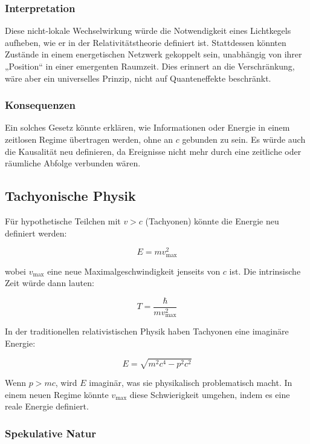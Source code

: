 \documentclass{article}
\begin{document}
	\subsubsection{Interpretation}
	
	Diese nicht-lokale Wechselwirkung würde die Notwendigkeit eines Lichtkegels aufheben, wie er in der Relativitätstheorie definiert ist. Stattdessen könnten Zustände in einem energetischen Netzwerk gekoppelt sein, unabhängig von ihrer „Position“ in einer emergenten Raumzeit. Dies erinnert an die Verschränkung, wäre aber ein universelles Prinzip, nicht auf Quanteneffekte beschränkt.
	
	\subsubsection{Konsequenzen}
	
	Ein solches Gesetz könnte erklären, wie Informationen oder Energie in einem zeitlosen Regime übertragen werden, ohne an \( c \) gebunden zu sein. Es würde auch die Kausalität neu definieren, da Ereignisse nicht mehr durch eine zeitliche oder räumliche Abfolge verbunden wären.
	
	\subsection{Tachyonische Physik}
	
	Für hypothetische Teilchen mit \( v > c \) (Tachyonen) könnte die Energie neu definiert werden:
	
	\[
	E = m v_{\text{max}}^2
	\]
	
	wobei \( v_{\text{max}} \) eine neue Maximalgeschwindigkeit jenseits von \( c \) ist. Die intrinsische Zeit würde dann lauten:
	
	\[
	T = \frac{\hbar}{m v_{\text{max}}^2}
	\]
	
	In der traditionellen relativistischen Physik haben Tachyonen eine imaginäre Energie:
	
	\[
	E = \sqrt{m^2 c^4 - p^2 c^2}
	\]
	
	Wenn \( p > mc \), wird \( E \) imaginär, was sie physikalisch problematisch macht. In einem neuen Regime könnte \( v_{\text{max}} \) diese Schwierigkeit umgehen, indem es eine reale Energie definiert.
	
	\subsubsection{Spekulative Natur}
	
\end{document}

